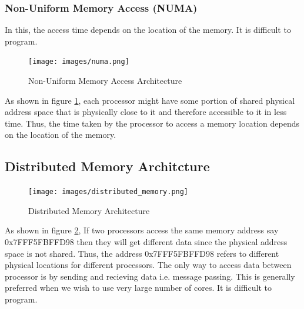 \documentclass[12pt]{article}
\begin{document}
\subsubsection{Non-Uniform Memory Access (NUMA)}
In this, the access time depends on the location of the memory. It is difficult to program.
\begin{figure}[H]
    \centering
    \texttt{[image: images/numa.png]}
    \caption{Non-Uniform Memory Access Architecture}
    \label{fig:numa}
\end{figure}
As shown in figure \ref{fig:numa}, each processor might have some portion of shared physical address space that is physically close to it and
therefore accessible to it in less time. Thus, the time taken by the processor to access a memory location depends on the location of the memory.

\subsection{Distributed Memory Architcture}
\begin{figure}[H]
    \centering
    \texttt{[image: images/distributed\_memory.png]}
    \caption{Distributed Memory Architecture}
    \label{fig:distributed_memory}
\end{figure}
As shown in figure \ref{fig:distributed_memory},
If two processors access the same memory address say 0x7FFF5FBFFD98 then they will get different data since 
the physical address space is not shared. Thus, the address 0x7FFF5FBFFD98 refers to different physical locations for different processors.
The only way to access data between processor is by sending and recieving data i.e. message passing.
This is generally preferred when we wish to use very large number of cores.
It is difficult to program.
\end{document}
